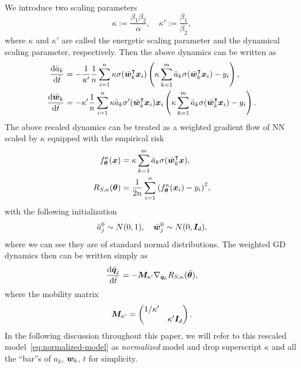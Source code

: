 \documentclass{article}
\begin{document}
We introduce two scaling parameters
\begin{equation}
    \kappa := \frac{\beta_1\beta_2}{\alpha}, \quad \kappa' :=\frac{\beta_1}{\beta_2},
\end{equation}
where $\kappa$ and $\kappa'$ are called the energetic scaling parameter and the dynamical scaling parameter, respectively. Then the above dynamics can be written as
\begin{align*}
    \frac{\mathrm{d} \bar{a}_k}{\mathrm{d} \bar{t}}
     & = -\frac{1}{\kappa'}\frac{1}{n}\sum_{i=1}^n \kappa\sigma(\bar{\bm{w}}_k^\intercal\bm{x}_i) \left(\kappa\sum_{k=1}^{m}\bar{a}_k\sigma(\bar{\bm{w}}_k^\intercal\bm{x}_i)-y_i\right),      \\
    \frac{\mathrm{d} \bar{\bm{w}}_k}{\mathrm{d} \bar{t}}
     & = -\kappa'\frac{1}{n}\sum_{i=1}^n\kappa \bar{a}_k\sigma'(\bar{\bm{w}}_k^\intercal\bm{x}_i)\bm{x}_i \left(\kappa\sum_{k=1}^{m}\bar{a}_k\sigma(\bar{\bm{w}}_k^\intercal\bm{x}_i)-y_i\right).
\end{align*}
The above recaled dynamics can be treated as a weighted gradient flow of NN scaled by $\kappa$ equipped with the empirical risk
\begin{align}\label{eq:normalized-model}
    f^{\kappa}_{\bm{\theta}}(\bm{x})
     & = \kappa\sum_{k=1}^{m}\bar{a}_k\sigma(\bar{\bm{w}}_k^\intercal\bm{x}),       \\
    R_{S, \kappa}(\bm{\theta})
     & =\frac{1}{2n}\sum_{i=1}^n{(f^{\kappa}_{\bm{\theta}}(\bm{x}_i)-y_i)}^2,
\end{align}
with the following initialization
\begin{equation}
    \bar{a}_j^0\sim N(0,1), \quad \bar{\bm{w}}_j^0\sim N(0,\bm{I}_d),
\end{equation}
where we can see they are of standard normal distributions. The weighted GD dynamics then can be written simply as
\begin{equation} \label{eq:qdynamics}
    \frac{\mathrm{d}\bar{\bm{q}}_j}{\mathrm{d} \bar{t}} = -\bm{M}_{\kappa'}\nabla_{\bm{q}_k}R_{S,\kappa}(\bar{\bm{\theta}}),
\end{equation}
where the mobility matrix
\begin{equation}
    \bm{M}_{\kappa'} =
    \begin{pmatrix}
        1/\kappa' &              \\
                  & \kappa'\bm{I}_d
    \end{pmatrix}.
\end{equation}
In the following discussion throughout this paper, we will refer to this rescaled model~\eqref{eq:normalized-model} as \emph{normalized} model and drop superscript $\kappa$ and all the ``bar''s of $a_k$, $\bm{w}_k$, $t$ for simplicity.
\end{document}
